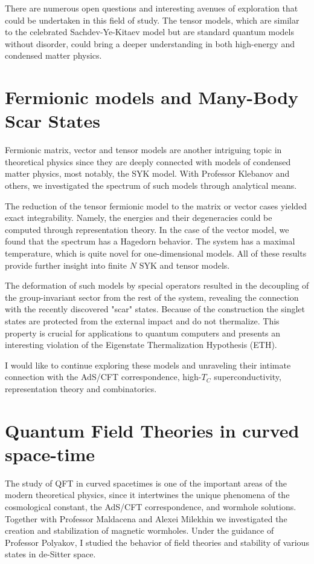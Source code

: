 \documentclass[11pt]{article}
\begin{document}
There are numerous open questions and interesting avenues of exploration that could be undertaken in this field of study. The tensor models, which are similar to the celebrated Sachdev-Ye-Kitaev
model but are standard quantum models without
disorder, could bring a deeper understanding in both high-energy and
condensed matter physics.

\section*{Fermionic models and Many-Body Scar States}



Fermionic matrix, vector and tensor models are another intriguing topic in theoretical physics since they are deeply connected with models of condensed matter physics, most notably, the SYK model. With Professor Klebanov and others, we investigated the spectrum of such models through analytical means. 

The reduction of the tensor fermionic model to the matrix or vector cases yielded exact integrability. Namely, the energies and their degeneracies could be computed through representation theory. In the case of the vector model, we found that the spectrum has a Hagedorn behavior. The system has a maximal temperature, which is quite novel for one-dimensional models. All of these results provide further insight into finite $N$ SYK and tensor models. 


The deformation of such models by special operators resulted in the decoupling of the group-invariant sector from the rest of the system, revealing the connection with the recently discovered "scar" states. Because of the construction the singlet states are protected from the external impact and do not thermalize.
This property is crucial for applications to quantum computers and presents an interesting violation of the Eigenstate Thermalization Hypothesis (ETH).


I would like to continue exploring these models and unraveling their intimate connection with the AdS/CFT correspondence, high-$T_C$ superconductivity,
representation theory and combinatorics. %


\section*{Quantum Field Theories in curved space-time}
The study of QFT in curved spacetimes is one of the important areas of the modern theoretical physics, since it intertwines the unique phenomena of the cosmological constant, the AdS/CFT correspondence, and wormhole solutions. Together with Professor Maldacena and Alexei Milekhin we investigated the creation and stabilization of magnetic wormholes. Under the guidance of Professor Polyakov, I studied the behavior of field theories and stability of various states in de-Sitter space.
\end{document}
